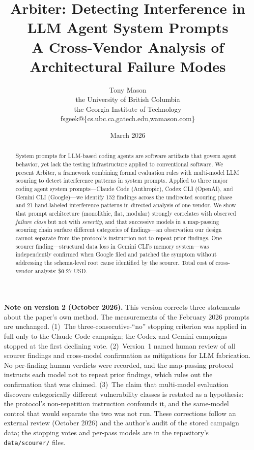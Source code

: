 \documentclass[11pt,a4paper]{article}
\title{\textbf{Arbiter: Detecting Interference in LLM Agent System Prompts}\\[0.5em]
\large A Cross-Vendor Analysis of Architectural Failure Modes}
\author{Tony Mason \\ the University of British Columbia \\ the Georgia Institute of Technology \\ fsgeek@\{cs.ubc.ca,gatech.edu,wamason.com\} }
\date{March 2026}
\begin{document}
\maketitle

\noindent\textbf{Note on version 2 (October 2026).}\enspace
This version corrects three statements about the paper's own method.
The measurements of the February 2026 prompts are unchanged. (1)~The
three-consecutive-``no'' stopping criterion was applied in full only to
the Claude Code campaign; the Codex and Gemini campaigns stopped at the
first declining vote. (2)~Version~1 named human review of all scourer
findings and cross-model confirmation as mitigations for LLM
fabrication. No per-finding human verdicts were recorded, and the
map-passing protocol instructs each model not to repeat prior findings,
which rules out the confirmation that was claimed. (3)~The claim that
multi-model evaluation discovers categorically different vulnerability
classes is restated as a hypothesis: the protocol's non-repetition
instruction confounds it, and the same-model control that would
separate the two was not run. These corrections follow an external
review (October 2026) and the author's audit of the stored campaign
data; the stopping votes and per-pass models are in the repository's
\texttt{data/scourer/} files.

\begin{abstract}
System prompts for LLM-based coding agents are software artifacts that
govern agent behavior, yet lack the testing infrastructure applied to
conventional software. We present Arbiter, a framework combining formal
evaluation rules with multi-model LLM scouring to detect interference
patterns in system prompts. Applied to three major coding agent system
prompts---Claude Code (Anthropic), Codex CLI (OpenAI), and Gemini CLI
(Google)---we identify 152 findings across the undirected scouring
phase and 21 hand-labeled interference patterns in directed analysis
of one vendor. We show that prompt architecture (monolithic, flat,
modular) strongly correlates with observed \emph{failure class} but not
with
\emph{severity}, and that successive models in a map-passing scouring
chain surface different categories of findings---an observation our
design cannot separate from the protocol's instruction not to repeat
prior findings. One scourer finding---structural data loss in Gemini CLI's
memory system---was independently confirmed when Google filed and
patched the symptom without addressing the schema-level root cause
identified by the scourer. Total cost of cross-vendor analysis: \$0.27
USD.
\end{abstract}
\end{document}
